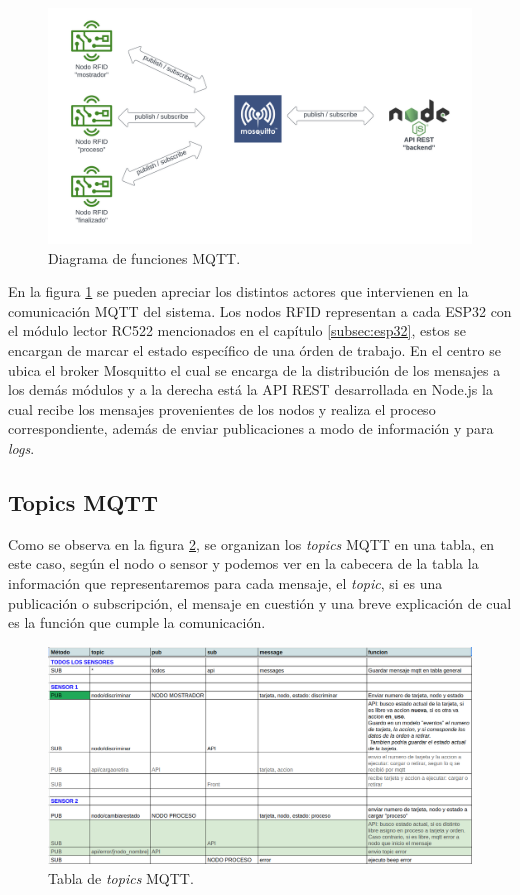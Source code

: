 \begin{figure}[ht]
	\centering
	\includegraphics[scale=.15]{./Figures/mqtt-funciones.png}
	\caption{Diagrama de funciones MQTT.}
	\label{fig:mqttfunciones}
	
\end{figure}

En la figura \ref{fig:mqttfunciones} se pueden apreciar los distintos actores que intervienen en la comunicación MQTT del sistema. Los nodos RFID representan a cada ESP32 con el módulo lector RC522 mencionados en el capítulo \ref{subsec:esp32}, estos se encargan de marcar el estado específico de una órden de trabajo. En el centro se ubica el broker Mosquitto el cual se encarga de la distribución de los mensajes a los demás módulos y a la derecha está la API REST desarrollada en Node.js la cual recibe los mensajes provenientes de los nodos y realiza el proceso correspondiente, además de enviar publicaciones a modo de información y para \textit{logs}.

\subsection{Topics MQTT}
\label{subsec:mqtttopics}

Como se observa en la figura \ref{fig:mqtttopics}, se organizan los \textit{topics} MQTT en una tabla, en este caso, según el nodo o sensor y podemos ver en la cabecera de la tabla la información que representaremos para cada mensaje, el \textit{topic}, si es una publicación o subscripción, el mensaje en cuestión y una breve explicación de cual es la función que cumple la comunicación.

\begin{figure}[H]
	\centering
	\includegraphics[scale=.30]{./Figures/mqtt-topics.png}
	\caption{Tabla de \textit{topics} MQTT.}
	\label{fig:mqtttopics}
\end{figure}

